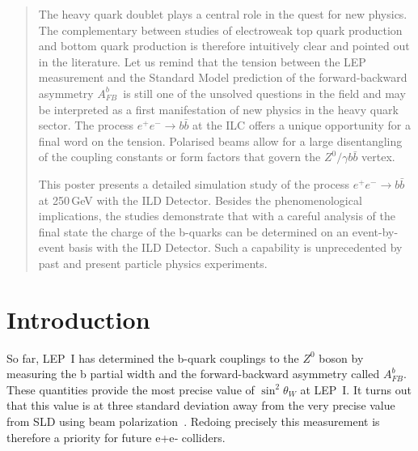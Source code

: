 \documentclass[a0,portrait]{a0poster}
\newcommand{\afb}{$A_{FB}^b$}
\begin{document}
\begin{multicols}{2} %


\color{Navy} %

\begin{abstract}
The heavy quark doublet plays a central role in the quest for new physics. The complementary between studies of electroweak top quark production and bottom quark production is therefore intuitively clear and pointed out in the literature. Let us remind that the tension between the LEP measurement and the Standard Model prediction of the forward-backward asymmetry \afb\ is still one of the unsolved questions in the field and may be interpreted as a first manifestation of new physics in the heavy quark sector. The process $e^+e^-\to b\bar{b}$ at the ILC offers a unique opportunity for a final word on the tension. Polarised beams allow for a large disentangling of the coupling constants or form factors that govern the $Z^0/\gamma b \bar{b}$ vertex.

This poster presents a detailed simulation study of the process $e^+e^-\to b\bar{b}$ at 250\,GeV with the ILD Detector. Besides the phenomenological implications, the studies demonstrate that with a careful analysis of the final state the charge of the b-quarks can be determined on an event-by-event basis with the ILD Detector. Such a capability is unprecedented by past and present particle physics experiments.
\end{abstract}


\color{SaddleBrown} %

\section*{Introduction}

So far, LEP~I has determined the b-quark couplings to the $Z^0$ boson by measuring the b partial width 
and the forward-backward asymmetry called \afb. 
These quantities provide the most precise value of $\sin^2\theta_W$ at LEP~I. It turns out that this value is at three standard deviation away from the very precise value from SLD using beam polarization~\cite{bib:AfbSMFit}. 
Redoing precisely this measurement is therefore a priority for future e+e‐ colliders. 



\end{multicols}
\end{document}
